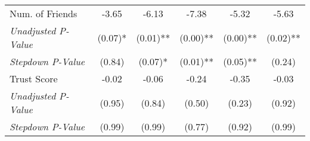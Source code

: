 \begin{tabular}{l c c c c c}
Num. of Friends & -3.65 & -6.13 & -7.38 & -5.32 & -5.63 \\
\quad \textit{Unadjusted P-Value} & (0.07)* & (0.01)** & (0.00)** & (0.00)** & (0.02)** \\
\quad \textit{Stepdown P-Value} & (0.84) & (0.07)* & (0.01)** & (0.05)** & (0.24) \\
Trust Score & -0.02 & -0.06 & -0.24 & -0.35 & -0.03 \\
\quad \textit{Unadjusted P-Value} & (0.95) & (0.84) & (0.50) & (0.23) & (0.92) \\
\quad \textit{Stepdown P-Value} & (0.99) & (0.99) & (0.77) & (0.92) & (0.99) \\
\bottomrule
\end{tabular}

